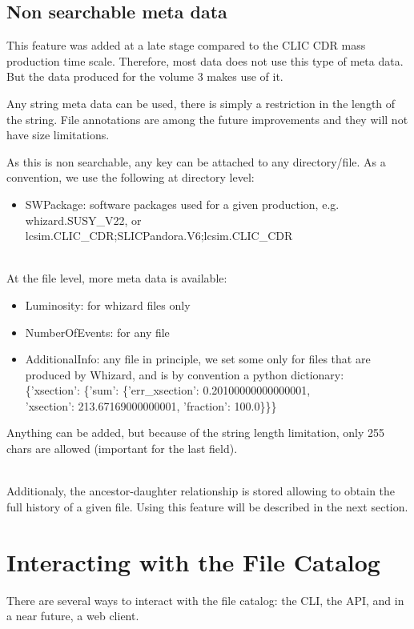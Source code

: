 \documentclass[a4paper,12pt]{article}
\begin{document}
\subsection{Non searchable meta data}
This feature was added at a late stage compared to the CLIC CDR mass production
time scale. Therefore, most data does not use this type of meta data. But the
data produced for the volume 3 makes use of it. 

Any string meta data can be used, there is simply a restriction in the length of
the string. File annotations are among the future improvements and they will
not have size limitations.

As this is non searchable, any key can be attached to any directory/file. As a
convention, we use the following at directory level:
\begin{itemize}
  \item SWPackage: software packages used for a given production, e.g.
  whizard.SUSY\_V22, or \\lcsim.CLIC\_CDR;SLICPandora.V6;lcsim.CLIC\_CDR
\end{itemize}

~\\

At the file level, more meta data is available:
\begin{itemize}
  \item Luminosity: for whizard files only
  \item NumberOfEvents: for any file
  \item AdditionalInfo: any file in principle, we set some only
  for files that are produced by Whizard, and is by convention a
  python dictionary: \\ \{'xsection': \{'sum': \{'err\_xsection':
  0.20100000000000001, \\'xsection': 213.67169000000001, 'fraction': 100.0\}\}\}
\end{itemize}
Anything can be added, but because of the string length limitation, only 255
chars are allowed (important for the last field).

~\\

Additionaly, the ancestor-daughter relationship is stored allowing to obtain the
full history of a given file. Using this feature will be described in the next
section.

\section{Interacting with the File Catalog}\label{sec:usingfc}
There are several ways to interact with the file catalog: the CLI, the API, and
in a near future, a web client.
\end{document}
